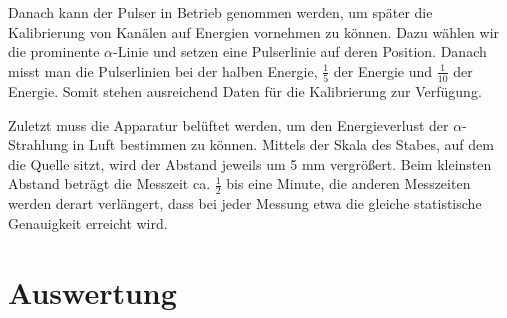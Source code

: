 \documentclass[bigchapter,colorback,accentcolor=tud4b,linedtoc,11pt]{tudreport}
\begin{document}
Danach kann der Pulser in Betrieb genommen werden, um später die Kalibrierung von Kanälen auf Energien vornehmen zu können. Dazu wählen wir die prominente $\alpha$-Linie und setzen eine Pulserlinie auf deren Position. Danach misst man die Pulserlinien bei der halben Energie, $\frac{1}{5}$ der Energie und $\frac{1}{10}$ der Energie. Somit stehen ausreichend Daten für die Kalibrierung zur Verfügung. 

Zuletzt muss die Apparatur belüftet werden, um den Energieverlust der $\alpha$-Strahlung in Luft bestimmen zu können. Mittels der Skala des Stabes, auf dem die Quelle sitzt, wird der Abstand jeweils um 5 mm vergrößert. Beim kleinsten Abstand beträgt die Messzeit ca. $\frac{1}{2}$ bis eine Minute, die anderen Messzeiten werden derart verlängert, dass bei jeder Messung etwa die gleiche statistische Genauigkeit erreicht wird. 

\chapter{Auswertung}
\end{document}
